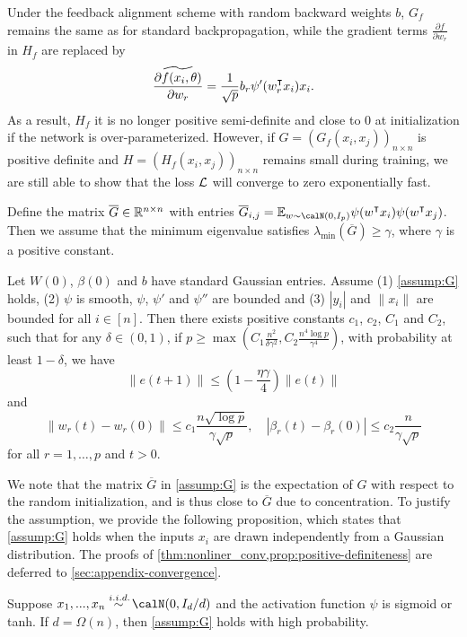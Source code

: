 Under the feedback alignment scheme with random backward weights $b$, $G_f$ remains the same as for standard backpropagation, while the gradient terms $\frac{\partial f}{\partial w_r}$ in $H_f$
are replaced by
\begin{align}\label{eqn:alignment-update-f}
  \widetilde{\frac{\partial f(x_i, \theta)}{\partial w_r}}   = \frac{1}{\sqrt{p}} b_r \psi'(w_r\transpose x_i)x_i.
\end{align}
As a result, $H_f$ it is no longer positive semi-definite and close to $0$ at initialization if the network is over-parameterized. However, if $G = (G_f(x_i,x_j))_{n\times n}$ is positive definite and $H = (H_f(x_i,x_j))_{n\times n}$ remains small during training, we are still able to show that the loss $\mathcal{L}$ will converge to zero exponentially fast.

\begin{assumption}\label{assump:G}
Define the matrix $\overline{G} \in \mathbb{R}^{n\times n}$ with entries
$\overline{G}_{i,j} = \E_{w\sim \calN(0,I_p)}\psi(w\transpose x_i) \psi(w\transpose  x_j)$.
Then we assume that the minimum eigenvalue satisfies $\lambda_{\min}(\overline{G}) \geq \gamma$, where $\gamma$ is a positive constant.
\end{assumption}
\vskip5pt

\begin{theorem}\label{thm:nonliner_conv}
Let $W(0)$, $\beta(0)$ and $b$ have \iid standard Gaussian entries. Assume \textnormal{(1)} \cref{assump:G} holds, \textnormal{(2)} $\psi$ is smooth, $\psi$, $\psi'$ and $\psi''$ are bounded and \textnormal{(3)} $|y_i|$ and $\|x_i\|$ are bounded for all $i\in[n]$. Then there exists positive constants $c_1$, $c_2$, $C_1$ and $C_2$, such that for any $\delta\in(0,1)$, if $p \geq \max\left(C_1\frac{n^2}{\delta\gamma^2}, C_2\frac{n^4\log p}{\gamma^4}\right)$, with probability at least $1-\delta$, we have
\begin{equation}\label{eq:conv}
    \|e(t+1)\| \leq (1-\frac{\eta\gamma}{4})\|e(t)\|
\end{equation}
and
\begin{equation}
\label{eq:weights}
    \|w_r(t)-w_r(0)\| \leq c_1\frac{n\sqrt{\log p}}{\gamma\sqrt p}, \quad |\beta_r(t)-\beta_r(0)| \leq c_2\frac{n}{\gamma\sqrt p}
\end{equation}
for all $r=1,\ldots, p$ and $t>0$.
\end{theorem}

We note that the matrix $\overline{G}$ in \cref{assump:G} is the expectation of $G$ with respect to the random initialization, and is thus close to $\overline{G}$ due to concentration. To justify the assumption, we provide the following proposition, which states that \cref{assump:G} holds when the inputs $x_i$ are drawn independently from a Gaussian distribution. The proofs of \cref{thm:nonliner_conv,prop:positive-definiteness} are deferred to \cref{sec:appendix-convergence}.

\begin{proposition}\label{prop:positive-definiteness}
Suppose $x_1,...,x_n \overset{\iid}{\sim} \calN(0,I_d/d)$ and the activation function $\psi$ is sigmoid or tanh. If $d=\Omega(n)$, then \cref{assump:G} holds with high probability.
\end{proposition}
